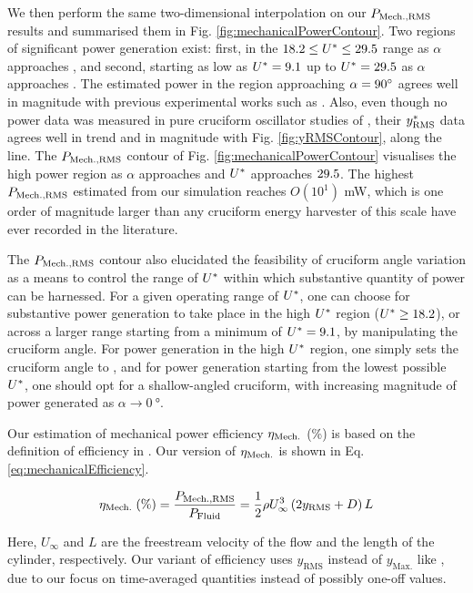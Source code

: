\documentclass[oneside]{utmthesis}
\begin{document}
We then perform the same two-dimensional interpolation on our $P_{\text{Mech.,RMS}}$ results and summarised them in Fig. \ref{fig:mechanicalPowerContour}. Two regions of significant power generation exist: first, in the $18.2 \leq U^{*} \leq 29.5$ range as $\alpha$ approaches \angfi{}, and second, starting as low as $U^{*} = 9.1$ up to $U^{*} = 29.5$ as $\alpha$ approaches \angon{}. The estimated power in the region approaching $\alpha = \angfi{}$ agrees well in magnitude with previous experimental works such as \citet{Koide2013}. Also, even though no power data was measured in pure cruciform oscillator studies of \citet{Koide2009,Nguyen2012}, their $y^{*}_{\text{RMS}}$ data agrees well in trend and in magnitude with Fig. \ref{fig:yRMSContour}, along the \angfi{} line. The $P_{\text{Mech.,RMS}}$ contour of Fig. \ref{fig:mechanicalPowerContour} visualises the high power region as $\alpha$ approaches \angon{} and $U^{*}$ approaches $29.5$. The highest $P_{\text{Mech.,RMS}}$ estimated from our simulation reaches $O(10^{1})$ \si{\milli\watt}, which is one order of magnitude larger than any cruciform energy harvester of this scale have ever recorded in the literature.

The $P_{\text{Mech.,RMS}}$ contour also elucidated the feasibility of cruciform angle variation as a means to control the range of $U^{*}$ within which substantive quantity of power can be harnessed. For a given operating range of $U^{*}$, one can choose for substantive power generation to take place in the high $U^{*}$ region ($U^{*} \geq 18.2$), or across a larger range starting from a minimum of $U^{*} = 9.1$, by manipulating the cruciform angle. For power generation in the high $U^{*}$ region, one simply sets the cruciform angle to \angfi{}, and for power generation starting from the lowest possible $U^{*}$, one should opt for a shallow-angled cruciform, with increasing magnitude of power generated as $\alpha \rightarrow \SI{0}{\degree}$.

Our estimation of mechanical power efficiency $\eta_{\text{Mech.}}$ (\%) is based on the definition of efficiency in \citet{Sun2018}. Our version of $\eta_{\text{Mech.}}$ is shown in Eq. \ref{eq:mechanicalEfficiency}.

\begin{equation}
  \eta_{\text{Mech.}} \;(\%) = \frac{P_{\text{Mech.,RMS}}}{P_{\text{Fluid}}} = \frac{1}{2}\rho U^{3}_{\infty} \left( 2 y_{\text{RMS}} + D \right) L
  \label{eq:mechanicalEfficiency}
\end{equation}

\noindent Here, $U_{\infty}$ and $L$ are the freestream velocity of the flow and the length of the cylinder, respectively. Our variant of efficiency uses $y_{\text{RMS}}$ instead of $y_{\text{Max.}}$ like \citet{Sun2018}, due to our focus on time-averaged quantities instead of possibly one-off values.
\end{document}
